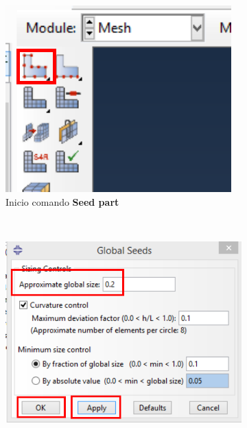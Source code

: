 \begin{enumerate}
  \begin{figure}[H]
    \centering
    \begin{subfigure}{0.15\textwidth}
      \includegraphics[width=\textwidth]{./body/images/imagen53.pdf}
      \caption{Inicio comando \textbf{Seed part}}
      \label{figu53}
    \end{subfigure}%
    ~ %
    \begin{subfigure}{0.33\textwidth}
      \includegraphics[width=\textwidth]{./body/images/imagen54.pdf}

\end{subfigure}
\end{figure}
\end{enumerate}
